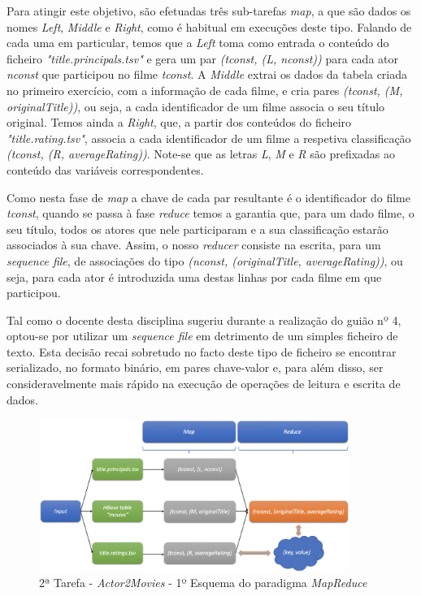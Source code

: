 \documentclass[a4paper]{report}
\begin{document}
{			Para atingir este objetivo, são efetuadas três sub-tarefas \textit{map}, a que são dados os nomes \textit{Left}, \textit{Middle} e \textit{Right}, como é habitual em execuções deste tipo. Falando de cada uma em particular, temos que a \textit{Left} toma como entrada o conteúdo do ficheiro \textit{"title.principals.tsv"} e gera um par \textit{(tconst, (L, nconst))} para cada ator \textit{nconst} que participou no filme \textit{tconst}. A \textit{Middle} extrai os dados da tabela criada no primeiro exercício, com a informação de cada filme, e cria pares \textit{(tconst, (M, originalTitle))}, ou seja, a cada identificador de um filme associa o seu título original. Temos ainda a \textit{Right}, que, a partir dos conteúdos do ficheiro \textit{"title.rating.tsv"}, associa a cada identificador de um filme a respetiva classificação \textit{(tconst, (R, averageRating))}.
			Note-se que as letras \textit{L}, \textit{M} e \textit{R} são prefixadas ao conteúdo das variáveis correspondentes.
			
			Como nesta fase de \textit{map} a chave de cada par resultante é o identificador do filme \textit{tconst}, quando se passa à fase \textit{reduce} temos a garantia que, para um dado filme, o seu título, todos os atores que nele participaram e a sua classificação estarão associados à sua chave. Assim, o nosso \textit{reducer} consiste na escrita, para um \textit{sequence file}, de associações do tipo \textit{(nconst, (originalTitle, averageRating))}, ou seja, para cada ator é introduzida uma destas linhas por cada filme em que participou.

			Tal como o docente desta disciplina sugeriu durante a realização do guião nº 4, optou-se por utilizar um \textit{sequence file} em detrimento de um simples ficheiro de texto. Esta decisão recai sobretudo no facto deste tipo de ficheiro se encontrar serializado, no formato binário, em pares chave-valor e, para além disso, ser consideravelmente mais rápido na execução de operações de leitura e escrita de dados.
			\begin{figure}[H]
				\centering
				\includegraphics[width=0.9\textwidth]{Imagens/2ª Tarefa - Actor2Movies - 1º Esquema MapReduce.png}
				\caption{2ª Tarefa - \textit{Actor2Movies} - 1º Esquema do paradigma \textit{MapReduce}}
				\label{fig:19}
			\end{figure}

}
\end{document}
